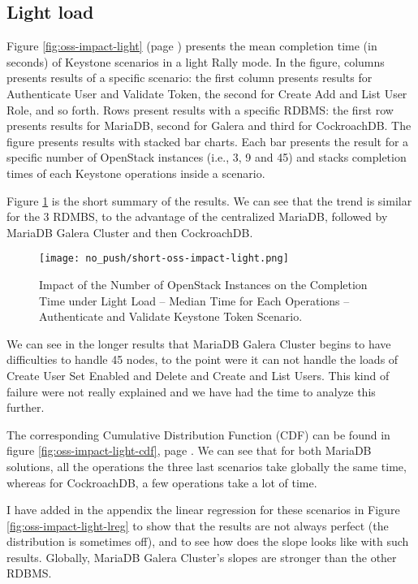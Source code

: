 \subsection{Light load}

Figure \ref{fig:oss-impact-light} (page \pageref{fig:oss-impact-light}) presents the mean completion time (in seconds) of Keystone scenarios in a light Rally mode. In the figure, columns presents results of a specific scenario: the first column presents results for Authenticate User and Validate Token, the second for Create Add and List User Role, and so forth. Rows present results with a specific RDBMS: the first row presents results for MariaDB, second for Galera and third for CockroachDB. The figure presents results with stacked bar charts. Each bar presents the result for a specific number of OpenStack instances (i.e., 3, 9 and 45) and stacks completion times of each Keystone operations inside a scenario.


Figure \ref{fig:short-oss-impact-light} is the short summary of the results. We can see that the trend is similar for the 3 RDMBS, to the advantage of the centralized MariaDB, followed by MariaDB Galera Cluster and then CockroachDB.
\begin{figure}[H]
  \vspace{-10pt}
  \centering
  \centerline{\texttt{[image: no\_push/short-oss-impact-light.png]}}
  \vspace{-5pt}
  \caption{Impact of the Number of OpenStack Instances on the Completion Time under Light Load – Median Time for Each Operations – Authenticate and Validate Keystone Token Scenario.}
  \vspace{-5pt}
  \label{fig:short-oss-impact-light}
\end{figure}

We can see in the longer results that MariaDB Galera Cluster begins to have difficulties to handle 45 nodes, to the point were it can not handle the loads of Create User Set Enabled and Delete and Create and List Users. This kind of failure were not really explained and we have had the time to analyze this further.

The corresponding Cumulative Distribution Function (CDF) can be found in figure \ref{fig:oss-impact-light-cdf}, page \pageref{fig:oss-impact-light-cdf}. We can see that for both MariaDB solutions, all the operations the three last scenarios take globally the same time, whereas for CockroachDB, a few operations take a lot of time.

I have added in the appendix the linear regression for these scenarios in Figure \ref{fig:oss-impact-light-lreg} to show that the results are not always perfect (the distribution is sometimes off), and to see how does the slope looks like with such results. Globally, MariaDB Galera Cluster's slopes are stronger than the other RDBMS.



